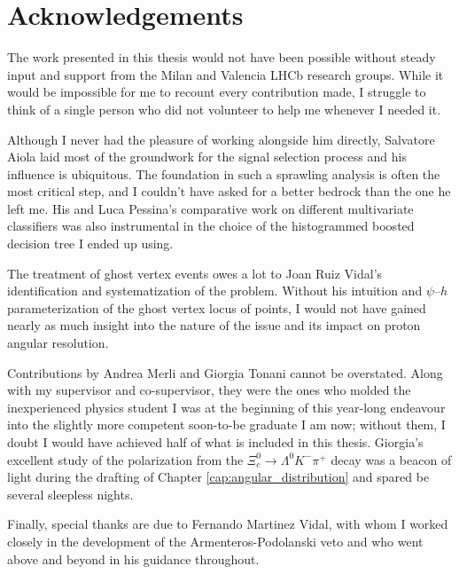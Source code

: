 \chapter*{Acknowledgements}

The work presented in this thesis would not have been possible without steady input and support from the Milan and Valencia LHCb research groups.
While it would be impossible for me to recount every contribution made, I struggle to think of a single person who did not volunteer to help me whenever I needed it. 

Although I never had the pleasure of working alongside him directly, Salvatore Aiola laid most of the groundwork for the \demonstratorshort signal selection process and his influence is ubiquitous.
The foundation in such a sprawling analysis is often the most critical step, and I couldn't have asked for a better bedrock than the one he left me.
His and Luca Pessina's comparative work on different multivariate classifiers was also instrumental in the choice of the histogrammed boosted decision tree I ended up using.

The treatment of ghost vertex \lambdadecay events owes a lot to Joan Ruiz Vidal's identification and systematization of the problem.
Without his intuition and $\psi$--$h$ parameterization of the ghost vertex locus of points, I would not have gained nearly as much insight into the nature of the issue and its impact on proton angular resolution.

Contributions by Andrea Merli and Giorgia Tonani cannot be overstated.
Along with my supervisor and co-supervisor, they were the ones who molded the inexperienced physics student I was at the beginning of this year-long endeavour into the slightly more competent soon-to-be graduate I am now;
without them, I doubt I would have achieved half of what is included in this thesis.
Giorgia's excellent study of the \lz polarization from the $\Xi_c^0 \rightarrow \Lambda^0 K^- \pi^+$ decay was a beacon of light during the drafting of Chapter \ref{cap:angular_distribution} and spared be several sleepless nights.

Finally, special thanks are due to Fernando Martinez Vidal, with whom I worked closely in the development of the Armenteros-Podolanski veto and who went above and beyond in his guidance throughout.